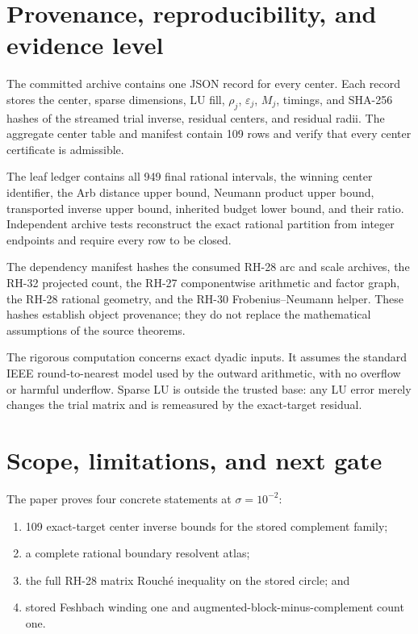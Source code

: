 \documentclass[11pt]{article}
\theoremstyle{definition}
\theoremstyle{remark}
\begin{document}
\section{Provenance, reproducibility, and evidence level}
\label{sec:reproducibility}

The committed archive contains one JSON record for every center.  Each
record stores the center, sparse dimensions, LU fill, $\rho_j$,
$\varepsilon_j$, $M_j$, timings, and SHA-256 hashes of the streamed trial
inverse, residual centers, and residual radii.  The aggregate center table
and manifest contain 109 rows and verify that every center certificate is
admissible.

The leaf ledger contains all 949 final rational intervals, the winning
center identifier, the Arb distance upper bound, Neumann product upper
bound, transported inverse upper bound, inherited budget lower bound, and
their ratio.  Independent archive tests reconstruct the exact rational
partition from integer endpoints and require every row to be closed.

The dependency manifest hashes the consumed RH-28 arc and scale archives,
the RH-32 projected count, the RH-27 componentwise arithmetic and factor
graph, the RH-28 rational geometry, and the RH-30 Frobenius--Neumann helper.
These hashes establish object provenance; they do not replace the
mathematical assumptions of the source theorems.

The rigorous computation concerns exact dyadic inputs.  It assumes the
standard IEEE round-to-nearest model used by the outward arithmetic, with no
overflow or harmful underflow.  Sparse LU is outside the trusted base: any
LU error merely changes the trial matrix and is remeasured by the
exact-target residual.

\section{Scope, limitations, and next gate}
\label{sec:limitations}

The paper proves four concrete statements at $\sigma=10^{-2}$:

\begin{enumerate}
 \item 109 exact-target center inverse bounds for the stored complement
       family;
 \item a complete rational boundary resolvent atlas;
 \item the full RH-28 matrix Rouch\'e inequality on the stored circle; and
 \item stored Feshbach winding one and augmented-block-minus-complement
       count one.
\end{enumerate}
\end{document}
